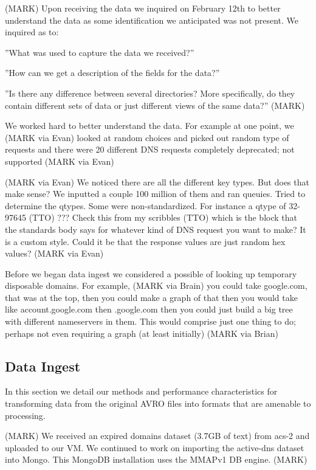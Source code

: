 \documentclass{acm_proc_article-sp}
\begin{document}


(MARK) Upon receiving the data we inquired on February 12th to better understand the data as some identification we anticipated was not present.  We inquired as to: 

''What was used to capture the data we received?''

''How can we get a description of the fields for the data?''

''Is there any difference between several directories?
More specifically, do they contain different sets of data or just different views of the same data?''
(MARK)


We worked hard to better understand the data.  For example at one point, we (MARK via Evan) looked at random choices and picked out random type of requests and there were 20 different DNS requests completely deprecated; not supported
(MARK via Evan)

(MARK via Evan)
We noticed there are all the different key types.  But does that make sense? We inputted a couple 100 million of them and ran queuies.  Tried to determine the qtypes.  Some were non-standardized.  For instance a qtype of 32-97645 (TTO) ??? Check this from my scribbles (TTO) which is the block that the standards body says for whatever kind of DNS request you want to make?  It is a custom style.  Could it be that the response values are just random hex values?  
(MARK via Evan)

Before we began data ingest we considered a possible of looking up temporary disposable domains. \cite{ManosbuildDNS}   For example, (MARK via Brain)
 you could take google.com, that was at the top, then you could make a graph of that then you would take like account.google.com then .google.com then you could just build a big tree with different nameservers in them.  This would comprise just one thing to do; perhaps not even requiring a graph (at least initially)
(MARK via Brian)

\subsection{Data Ingest}
In this section we detail our methods and performance characteristics for transforming data from the original AVRO files into formats that are amenable to processing.

(MARK)
We received an expired domains dataset (3.7GB of text) from acs-2 and uploaded to our VM.\cite{ChazdomainZ}  We continued to work on importing the active-dns dataset into Mongo.  This MongoDB installation uses the MMAPv1 DB engine.
(MARK)
\end{document}
